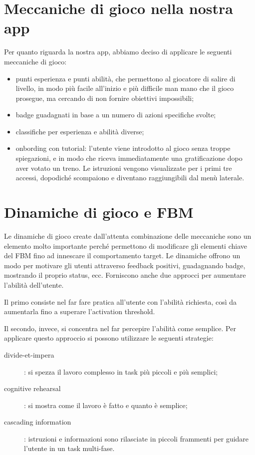 \section{Meccaniche di gioco nella nostra app\label{sec:meccaniche-app}}
Per quanto riguarda la nostra app, abbiamo deciso di applicare le seguenti meccaniche di gioco:
\begin{itemize}
    \item punti esperienza e punti abilità, che permettono al giocatore di salire di livello, in modo più facile all'inizio e più difficile man mano che il gioco prosegue, ma cercando di non fornire obiettivi impossibili;
    \item badge guadagnati in base a un numero di azioni specifiche svolte;
    \item classifiche per esperienza e abilità diverse;
    \item onbording con tutorial: l'utente viene introdotto al gioco senza troppe spiegazioni, e in modo che riceva immediatamente una gratificazione dopo aver votato un treno. Le istruzioni vengono visualizzate per i primi tre accessi, dopodiché scompaiono e diventano raggiungibili dal menù laterale.
\end{itemize}

\section{Dinamiche di gioco e FBM\label{sec:dinamiche-fbm}}

Le dinamiche di gioco create dall'attenta combinazione delle meccaniche sono un elemento molto importante perché permettono di modificare gli elementi chiave del FBM fino ad innescare il comportamento target.
Le dinamiche offrono un modo per motivare gli utenti attraverso feedback positivi, guadagnando badge, mostrando il proprio status, ecc. Forniscono anche due approcci per aumentare l'abilità dell'utente.

Il primo consiste nel far fare pratica all'utente con l'abilità richiesta, così da aumentarla fino a superare l'activation threshold.

Il secondo, invece, si concentra nel far percepire l'abilità come semplice. Per applicare questo  approccio si possono utilizzare le seguenti strategie:
\begin{description}
    \item[divide-et-impera]: si spezza il lavoro complesso in task più piccoli e più semplici;
    \item[cognitive rehearsal]: si mostra come il lavoro è fatto e quanto è semplice;
    \item[cascading information]: istruzioni e informazioni sono rilasciate in piccoli frammenti per guidare l'utente in un task multi-fase.
\end{description}

